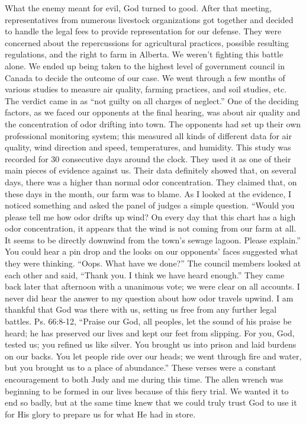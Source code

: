 \documentclass[twoside, 12pt]{book}
\begin{document}
What the enemy meant for evil, God turned to good. After that meeting, representatives from numerous livestock organizations got together and decided to handle the legal fees to provide representation for our defense. They were concerned about the repercussions for agricultural practices, possible resulting regulations, and the right to farm in Alberta. We weren’t fighting this battle alone. We ended up being taken to the highest level of government council in Canada to decide the outcome of our case. We went through a few months of various studies to measure air quality, farming practices, and soil studies, etc. The verdict came in as “not guilty on all charges of neglect.” One of the deciding factors, as we faced our opponents at the final hearing, was about air quality and the concentration of odor drifting into town. The opponents had set up their own professional monitoring system; this measured all kinds of different data for air quality, wind direction and speed, temperatures, and humidity. This study was recorded for 30 consecutive days around the clock. They used it as one of their main pieces of evidence against us. Their data definitely showed that, on several days, there was a higher than normal odor concentration. They claimed that, on these days in the month, our farm was to blame. As I looked at the evidence, I noticed something and asked the panel of judges a simple question. “Would you please tell me how odor drifts up wind? On every day that this chart has a high odor concentration, it appears that the wind is not coming from our farm at all. It seems to be directly downwind from the town's sewage lagoon. Please explain.” You could hear a pin drop and the looks on our opponents’ faces suggested what they were thinking. “Oops. What have we done?” The council members looked at each other and said, “Thank you. I think we have heard enough.” They came back later that afternoon with a unanimous vote; we were clear on all accounts. I never did hear the answer to my question about how odor travels upwind. I am thankful that God was there with us, setting us free from any further legal battles. 
Ps. 66:8-12, “Praise our God, all peoples, let the sound of his praise be heard; he has preserved our lives and kept our feet from slipping. For you, God, tested us; you refined us like silver. You brought us into prison and laid burdens on our backs. You let people ride over our heads; we went through fire and water, but you brought us to a place of abundance.” These verses were a constant encouragement to both Judy and me during this time. The allen wrench was beginning to be formed in our lives because of this fiery trial. We wanted it to end so badly, but at the same time knew that we could truly trust God to use it for His glory to prepare us for what He had in store.
\end{document}
